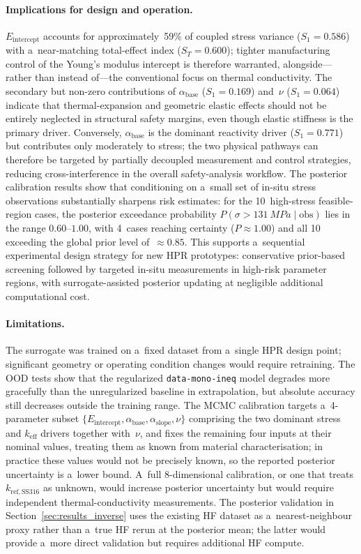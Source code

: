 \documentclass[pdflatex,sn-mathphys-num]{sn-jnl}
\theoremstyle{thmstyleone}
\theoremstyle{thmstyletwo}
\theoremstyle{thmstylethree}
\begin{document}
\paragraph{Implications for design and operation.}
$E_{\mathrm{intercept}}$ accounts for approximately~59\% of coupled stress
variance ($S_1 = 0.586$) with a~near-matching total-effect index ($S_T = 0.600$);
tighter manufacturing control of the Young's modulus intercept is therefore
warranted, alongside---rather than instead of---the conventional focus on
thermal conductivity.
The secondary but non-zero contributions of $\alpha_{\mathrm{base}}$
($S_1 = 0.169$) and~$\nu$ ($S_1 = 0.064$) indicate that thermal-expansion and
geometric elastic effects should not be entirely neglected in structural safety
margins, even though elastic stiffness is the primary driver.
Conversely, $\alpha_{\mathrm{base}}$ is the dominant reactivity driver
($S_1 = 0.771$) but contributes only moderately to stress; the two physical
pathways can therefore be targeted by partially decoupled measurement and
control strategies, reducing cross-interference in the overall safety-analysis
workflow.
The posterior calibration results show that conditioning on a~small set of
in-situ stress observations substantially sharpens risk estimates: for the
10~high-stress feasible-region cases, the posterior exceedance probability
$P(\sigma>\SI{131}{MPa}\mid\mathrm{obs})$ lies in the range $0.60$--$1.00$,
with 4~cases reaching certainty ($P \approx 1.00$) and all 10 exceeding the
global prior level of~$\approx 0.85$.
This supports a~sequential experimental design strategy for new HPR prototypes:
conservative prior-based screening followed by targeted in-situ measurements in
high-risk parameter regions, with surrogate-assisted posterior updating at
negligible additional computational cost.

\paragraph{Limitations.}
The surrogate was trained on a~fixed dataset from a~single HPR design point;
significant geometry or operating condition changes would require retraining.
The OOD tests show that the regularized \texttt{data-mono-ineq} model degrades
more gracefully than the unregularized baseline in extrapolation, but absolute
accuracy still decreases outside the training range.
The MCMC calibration targets a~4-parameter subset
$\{E_{\mathrm{intercept}}, \alpha_{\mathrm{base}}, \alpha_{\mathrm{slope}}, \nu\}$
comprising the two dominant stress and $k_{\mathrm{eff}}$ drivers together
with~$\nu$, and fixes the remaining four inputs at their nominal values,
treating them as known from material characterisation; in practice these
values would not be precisely known, so the reported posterior uncertainty is
a~lower bound.
A~full 8-dimensional calibration, or one that treats $k_{\mathrm{ref,SS316}}$
as unknown, would increase posterior uncertainty but would require
independent thermal-conductivity measurements.
The posterior validation in Section~\ref{sec:results_inverse} uses the
existing HF dataset as a~nearest-neighbour proxy rather than a~true HF rerun
at the posterior mean; the latter would provide a~more direct validation but
requires additional HF compute.
\end{document}
